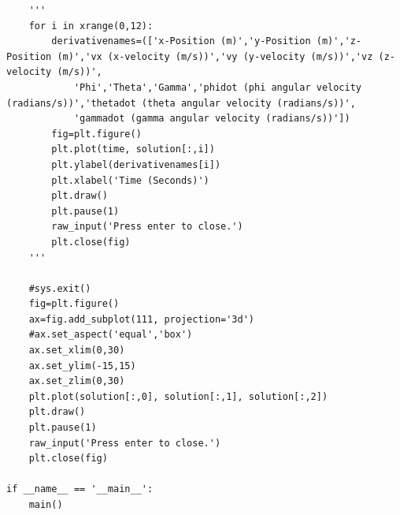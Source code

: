 \documentclass[a4paper,12pt, oneside]{article}
\begin{document}
\begin{verbatim}
    '''
    for i in xrange(0,12):
        derivativenames=(['x-Position (m)','y-Position (m)','z-Position (m)','vx (x-velocity (m/s))','vy (y-velocity (m/s))','vz (z-velocity (m/s))',
            'Phi','Theta','Gamma','phidot (phi angular velocity (radians/s))','thetadot (theta angular velocity (radians/s))',
            'gammadot (gamma angular velocity (radians/s))'])
        fig=plt.figure()
        plt.plot(time, solution[:,i])
        plt.ylabel(derivativenames[i])
        plt.xlabel('Time (Seconds)')
        plt.draw()
        plt.pause(1)
        raw_input('Press enter to close.')
        plt.close(fig)
    '''
    
    #sys.exit()
    fig=plt.figure()
    ax=fig.add_subplot(111, projection='3d')
    #ax.set_aspect('equal','box')
    ax.set_xlim(0,30)
    ax.set_ylim(-15,15)
    ax.set_zlim(0,30)
    plt.plot(solution[:,0], solution[:,1], solution[:,2])
    plt.draw()
    plt.pause(1)
    raw_input('Press enter to close.')
    plt.close(fig)

if __name__ == '__main__':
    main()
\end{verbatim}
\end{document}
